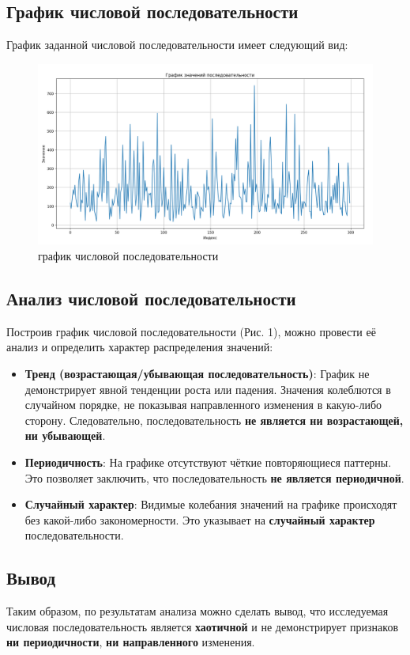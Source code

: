 \subsection{График числовой последовательности}
График заданной числовой последовательности имеет следующий вид:

\begin{figure}[h]
	\centering
	\includegraphics[width=1\textwidth]{../data/sequence.png}
	\caption{график числовой последовательности}
\end{figure}

\subsection{Анализ числовой последовательности}

Построив график числовой последовательности (Рис. 1), можно провести её анализ и определить характер распределения значений:

\begin{itemize}
	\item \textbf{Тренд (возрастающая/убывающая последовательность)}: График не демонстрирует явной тенденции роста или падения. Значения колеблются в случайном порядке, не показывая направленного изменения в какую-либо сторону. Следовательно, последовательность \textbf{не является ни возрастающей, ни убывающей}.

	\item \textbf{Периодичность}: На графике отсутствуют чёткие повторяющиеся паттерны. Это позволяет заключить, что последовательность \textbf{не является периодичной}.

	\item \textbf{Случайный характер}: Видимые колебания значений на графике происходят без какой-либо закономерности. Это указывает на \textbf{случайный характер} последовательности.
\end{itemize}

\subsection{Вывод}

Таким образом, по результатам анализа можно сделать вывод, что исследуемая числовая последовательность является \textbf{хаотичной} и не демонстрирует признаков \textbf{ни периодичности}, \textbf{ни направленного} изменения.
